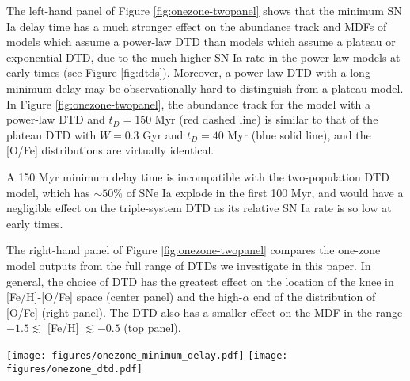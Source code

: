 \documentclass[modern,linenumbers]{aastex631}
\begin{document}
The left-hand panel of Figure \ref{fig:onezone-twopanel} shows that the minimum SN Ia delay time has a much stronger effect on the abundance track and MDFs of models which assume a power-law DTD than models which assume a plateau or exponential DTD, due to the much higher SN Ia rate in the power-law models at early times (see Figure \ref{fig:dtds}). Moreover, a power-law DTD with a long minimum delay may be observationally hard to distinguish from a plateau model. In Figure \ref{fig:onezone-twopanel}, the abundance track for the model with a power-law DTD and $t_D=150$ Myr (red dashed line) is similar to that of the plateau DTD with $W=0.3$ Gyr and $t_D=40$ Myr (blue solid line), and the [O/Fe] distributions are virtually identical. 

A 150 Myr minimum delay time is incompatible with the two-population DTD model, which has $\sim 50$\% of SNe Ia explode in the first 100 Myr, and would have a negligible effect on the triple-system DTD as its relative SN Ia rate is so low at early times. 

The right-hand panel of Figure \ref{fig:onezone-twopanel} compares the one-zone model outputs from the full range of DTDs we investigate in this paper. In general, the choice of DTD has the greatest effect on the location of the knee in [Fe/H]-[O/Fe] space (center panel) and the high-$\alpha$ end of the distribution of [O/Fe] (right panel). The DTD also has a smaller effect on the MDF in the range $-1.5\lesssim$ [Fe/H] $\lesssim-0.5$ (top panel).

\begin{figure*}
    \centering
    \texttt{[image: figures/onezone\_minimum\_delay.pdf]}
    \texttt{[image: figures/onezone\_dtd.pdf]}
    \caption{\textit{Left:} Comparison of one-zone models with minimum SN Ia delay times of 40 Myr (solid curves) and 150 Myr (dashed curves) for two DTDs: a power-law with $\alpha=-1.1$ (blue curves), and an exponential with $\tau=1.5$ Gyr (purple curves). The layout is similar to the plots in Figure \ref{fig:onezone-threepanel}.
    \textit{Right:} Comparison of one-zone models which assume all five functional forms for the DTD in this paper: triple-system (green), plateau with $W=1$ Gyr (cyan), exponential with $\tau=1.5$ Gyr (purple), power-law with $\alpha=-1.1$ (blue), and two-population (pink). A minimum SN Ia delay time of 40 Myr is assumed for all models.}
    \label{fig:onezone-twopanel}
\end{figure*}
\end{document}
